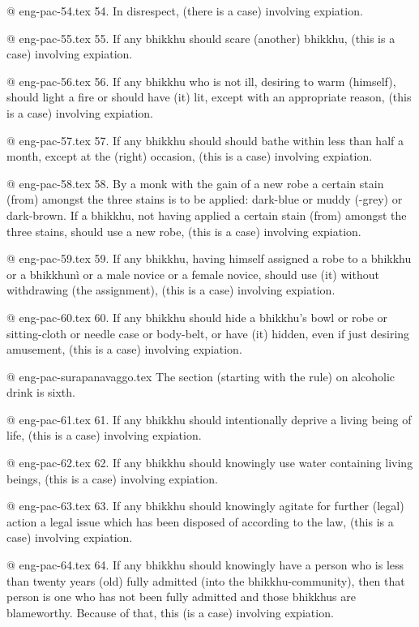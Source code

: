@ eng-pac-54.tex
54. In disrespect, (there is a case) involving expiation.

@ eng-pac-55.tex
55. If any bhikkhu should scare (another) bhikkhu, (this is a case) involving expiation.

@ eng-pac-56.tex
56. If any bhikkhu who is not ill, desiring to warm (himself), should light a fire or should have (it) lit, except with an appropriate reason, (this is a case) involving expiation.

@ eng-pac-57.tex
57. If any bhikkhu should should bathe within less than half a month, except at the (right) occasion, (this is a case) involving expiation.

@ eng-pac-58.tex
58. By a monk with the gain of a new robe a certain stain (from) amongst the three stains is to be applied: dark-blue or muddy (-grey) or dark-brown. If a bhikkhu, not having applied a certain stain (from) amongst the three stains, should use a new robe, (this is a case) involving expiation.

@ eng-pac-59.tex
59. If any bhikkhu, having himself assigned a robe to a bhikkhu or a bhikkhunì or a male novice or a female novice, should use (it) without withdrawing (the assignment), (this is a case) involving expiation.

@ eng-pac-60.tex
60. If any bhikkhu should hide a bhikkhu's bowl or robe or sitting-cloth or needle case or body-belt, or have (it) hidden, even if just desiring amusement, (this is a case) involving expiation.

@ eng-pac-surapanavaggo.tex
The section (starting with the rule) on alcoholic drink is sixth.

@ eng-pac-61.tex
61. If any bhikkhu should intentionally deprive a living being of life, (this is a case) involving expiation.

@ eng-pac-62.tex
62. If any bhikkhu should knowingly use water containing living beings, (this is a case) involving expiation.

@ eng-pac-63.tex
63. If any bhikkhu should knowingly agitate for further (legal) action a legal issue which has been disposed of according to the law, (this is a case) involving expiation.

@ eng-pac-64.tex
64. If any bhikkhu should knowingly have a person who is less than twenty years (old) fully admitted (into the bhikkhu-community), then that person is one who has not been fully admitted and those bhikkhus are blameworthy. Because of that, this (is a case) involving expiation.

